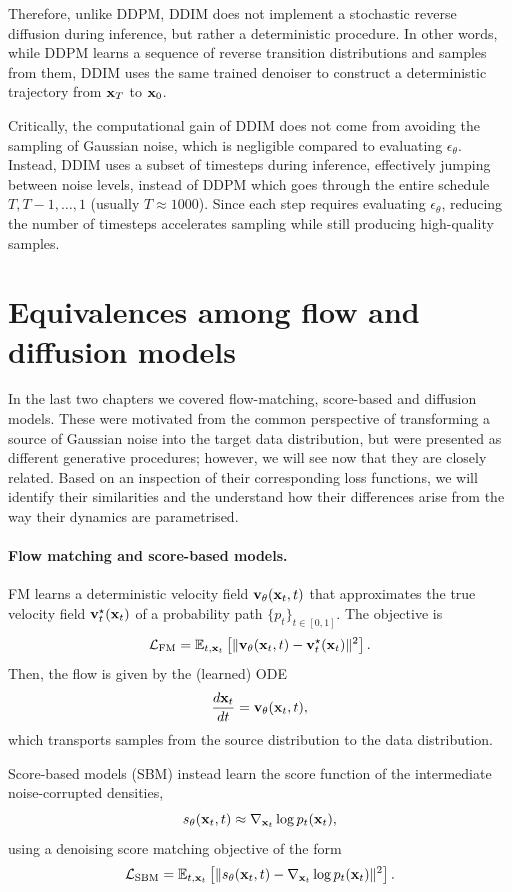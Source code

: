 Therefore, unlike DDPM, DDIM does not implement a stochastic reverse diffusion during inference, but rather a deterministic procedure. In other words, while DDPM learns a sequence of reverse transition distributions and samples from them, DDIM uses the same trained denoiser to construct a deterministic trajectory from ${ \mathbf{x}}_T$ to ${ \mathbf{x}}_0$.

Critically, the computational gain of DDIM does not come from avoiding the sampling of Gaussian noise, which is negligible compared to evaluating $\epsilon_\theta$. Instead, DDIM uses a subset of timesteps during inference, effectively jumping between noise levels, instead of DDPM which goes through the entire schedule $T,T-1,\dots,1$ (usually $T\approx1000$). Since each step requires evaluating $\epsilon_\theta$, reducing the number of timesteps accelerates sampling while still producing high-quality samples.

\section{Equivalences among flow and diffusion models}

In the last two chapters we covered flow-matching, score-based and diffusion models. These were motivated from the common perspective of transforming a source of Gaussian noise into the target data distribution, but were presented as different generative procedures; however, we will see now that they are closely related. Based on an inspection of their corresponding loss functions, we will identify their similarities and the understand how their differences arise from the way their dynamics are parametrised.

\paragraph{Flow matching and score-based models.}

FM learns a deterministic velocity field ${ \mathbf{v}}_\theta({ \mathbf{x}}_t,t)$ that approximates the true velocity field ${ \mathbf{v}}^\star_t({ \mathbf{x}}_t)$ of a probability path $\{p_t\}_{t\in[0,1]}$. The objective is
\[
\mathcal{L}_{\text{FM}}
=
\mathbb{E}_{t,{ \mathbf{x}}_t}
\left[
\|{ \mathbf{v}}_\theta({ \mathbf{x}}_t,t) - { \mathbf{v}}^\star_t({ \mathbf{x}}_t)\|^2
\right].
\]
Then, the flow is given by the (learned) ODE
\[
\frac{d{ \mathbf{x}}_t}{dt} = { \mathbf{v}}_\theta({ \mathbf{x}}_t,t),
\]
which transports samples from the source distribution to the data distribution.

Score-based models (SBM) instead learn the score function of the intermediate noise-corrupted densities,
\[
s_\theta({ \mathbf{x}}_t,t) \approx \nabla_{{ \mathbf{x}}_t}\log p_t({ \mathbf{x}}_t),
\]
using a denoising score matching objective of the form
\[
\mathcal{L}_{\text{SBM}}
=
\mathbb{E}_{t,{ \mathbf{x}}_t}
\left[
\|s_\theta({ \mathbf{x}}_t,t) - \nabla_{{ \mathbf{x}}_t}\log p_t({ \mathbf{x}}_t)\|^2
\right].
\]

